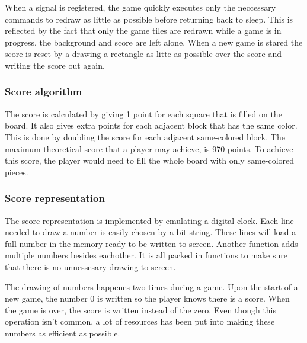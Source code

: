 When a signal is registered, the game quickly executes only the neccessary commands to redraw as little as possible before returning back to sleep.
This is reflected by the fact that only the game tiles are redrawn while a game is in progress, the background and score are left alone.
When a new game is stared the score is reset by a drawing a rectangle as litte as possible over the score and writing the score out again.

\subsubsection{Score algorithm}

The score is calculated by giving 1 point for each square that is filled on the board.
It also gives extra points for each adjacent block that has the same color.
This is done by doubling the score for each adjacent same-colored block.
The maximum theoretical score that a player may achieve, is 970 points.
To achieve this score, the player would need to fill the whole board with only same-colored pieces.

\subsubsection{Score representation}
The score representation is implemented by emulating a digital clock.
Each line needed to draw a number is easily chosen by a bit string.
These lines will load a full number in the memory ready to be written to screen.
Another function adds multiple numbers besides eachother.
It is all packed in functions to make sure that there is no unnessesary drawing to screen.

The drawing of numbers happenes two times during a game.
Upon the start of a new game, the number 0 is written so the player knows there is a score.
When the game is over, the score is written instead of the zero.
Even though this operation isn't common, a lot of resources has been put into making these numbers as efficient as possible.
